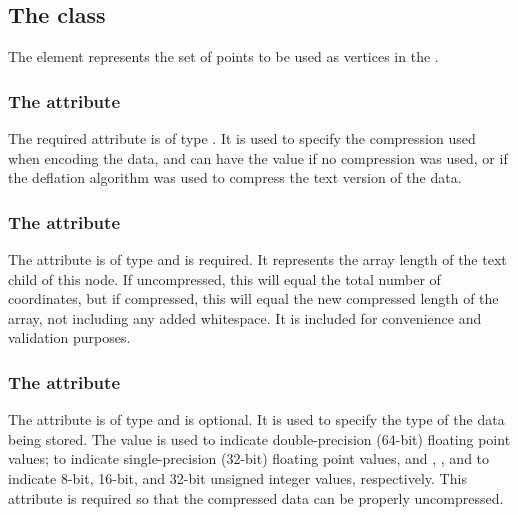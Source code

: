 \subsection{The  class}
\label{spatialpoints-class}
The \SpatialPoints element represents the set of points to be used as vertices in the \ParametricGeometry.

\subsubsection{The \fixttspace{} attribute}
The required  attribute is of type . It is used to specify the compression used when encoding the data, and can have the value  if no compression was used, or  if the deflation algorithm was used to compress the text version of the data.


\subsubsection{The \fixttspace{} attribute}
The  attribute is of type  and is required. It represents the array length of the  text child of this node.  If uncompressed, this will equal the total number of coordinates, but if compressed, this will equal the new compressed length of the array, not including any added whitespace.  It is included for convenience and validation purposes.


\subsubsection{The \fixttspace{} attribute}
The  attribute is of type  and is optional.  It is used to specify the type of the data being stored.  The value  is used to indicate double-precision (64-bit) floating point values;  to indicate single-precision (32-bit) floating point values, and , , and  to indicate 8-bit, 16-bit, and 32-bit unsigned integer values, respectively.  This attribute is required so that the compressed data can be properly uncompressed.

